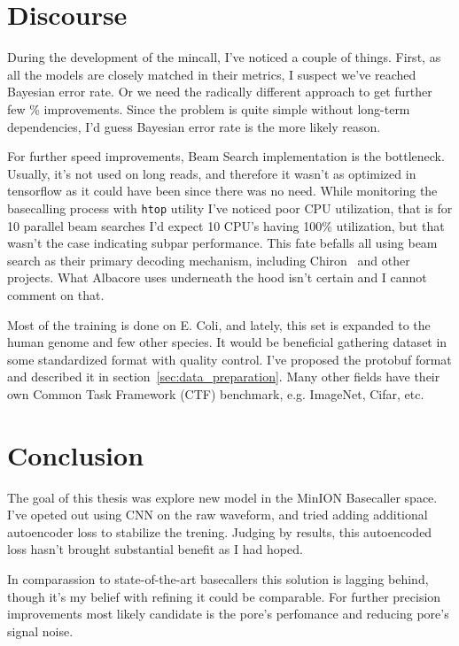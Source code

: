 \documentclass[times, utf8, diplomski, english]{fer}
\begin{document}
\chapter{Discourse}
\label{chap:discoure}
During the development of the mincall, I've noticed a couple of things. 
First, as all the models are closely matched in their metrics, I suspect we've reached Bayesian error rate. 
Or we need the radically different approach to get further few \% improvements. 
Since the problem is quite simple without long-term dependencies, I'd guess Bayesian error rate is the more likely reason.

For further speed improvements, Beam Search implementation is the bottleneck. 
Usually, it's not used on long reads, and therefore it wasn't as optimized in tensorflow as it could have been since there was no need. 
While monitoring the basecalling process with \texttt{htop} utility I've noticed poor CPU utilization, that is for 10 parallel beam searches I'd expect 10 CPU's having 100\% utilization, but that wasn't the case indicating subpar performance.
This fate befalls all using beam search as their primary decoding mechanism, including Chiron~\citep{chiron_teng} and other projects. 
What Albacore uses underneath the hood isn't certain and I cannot comment on that. 

Most of the training is done on E. Coli, and lately, this set is expanded to the human genome and few other species. 
It would be beneficial gathering dataset in some standardized format with quality control. 
I've proposed the protobuf format and described it in section~\ref{sec:data_preparation}. 
Many other fields have their own Common Task Framework (CTF) benchmark, e.g. ImageNet, Cifar, etc. 
\chapter{Conclusion}
\label{chap:conslusion}

The goal of this thesis was explore new model in the MinION Basecaller space. 
I've opeted out using CNN on the raw waveform, and tried adding additional autoencoder loss to stabilize the trening. 
Judging by results, this autoencoded loss hasn't brought substantial benefit as I had hoped. 

In comparassion to state-of-the-art basecallers this solution is lagging behind, though it's my belief with refining it could be comparable.
For further precision improvements most likely candidate is the pore's perfomance and reducing pore's signal noise.
\end{document}
